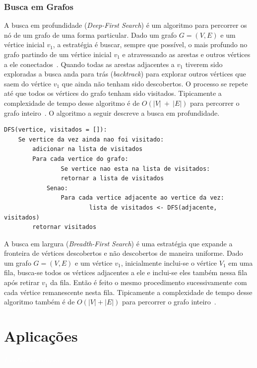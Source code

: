 \documentclass[11pt,fleqn]{book} %
\begin{document}
\subsection{Busca em Grafos}

A busca em profundidade (\textit{Deep-First Search}) é um algoritmo para percorrer os nó de um grafo de uma forma particular. 
Dado um grafo $G = (V,E)$ e um vértice inicial $v_1$, a estratégia é buscar, sempre que possível, o mais profundo no grafo partindo de um vértice inicial $v_1$ e atravessando as arestas e outros vértices a ele conectados~\cite{ziviani2007}.
Quando todas as arestas adjacentes a $v_1$ tiverem sido exploradas a busca anda para trás (\textit{backtrack}) para explorar outros vértices que saem do vértice $v_1$ que ainda não tenham sido descobertos.
O processo se repete até que todos os vértices do grafo tenham sido visitados.
Tipicamente a complexidade de tempo desse algoritmo é de $O(|V|~+~|E|)$ para percorrer o grafo inteiro~\cite{cormen2009}.
O algoritmo a seguir descreve a busca em profundidade.
\begin{lstlisting}
DFS(vertice, visitados = []):
	Se vertice da vez ainda nao foi visitado:
		adicionar na lista de visitados
        Para cada vertice do grafo:
        		Se vertice nao esta na lista de visitados:
		        retornar a lista de visitados
            Senao:
                Para cada vertice adjacente ao vertice da vez:
                		lista de visitados <- DFS(adjacente, visitados)
        retornar visitados
\end{lstlisting}

A busca em largura (\textit{Breadth-First Search}) é uma estratégia que expande a fronteira de vértices descobertos e não descobertos de maneira uniforme.
Dado um grafo $G = (V,E)$ e um vértice $v_1$, inicialmente inclui-se o vértice $V_1$ em uma fila, busca-se todos os vértices adjacentes a ele e inclui-se eles também nessa fila após retirar $v_1$ da fila.
Então é feito o mesmo procedimento sucessivamente com cada vértice remanescente nesta fila.
Tipicamente a complexidade de tempo desse algoritmo também é de $O(|V| + |E|)$ para percorrer o grafo inteiro~\cite{cormen2009}.


\chapter{Aplicações}\label{aplicacoes}
\vspace{6em}
\begin{flushright}
	\textit{\textcolor{white}{Um bonita citação...}}
\end{flushright}
\vspace{12em}
\end{document}
